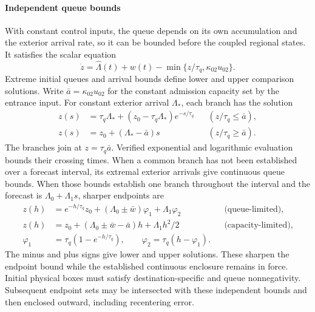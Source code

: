 \documentclass[preprint,12pt]{elsarticle}
\theoremstyle{definition}
\theoremstyle{plain}
\theoremstyle{definition}
\theoremstyle{plain}
\begin{document}
\paragraph{Independent queue bounds}
With constant control inputs, the queue depends on its own accumulation and
the exterior arrival rate, so it can be bounded before the coupled
regional states. It satisfies the scalar equation
\begin{equation}
 \dot z=\widehat\Lambda(t)+w(t)-\min\{z/\tau_q,\kappa_{02}u_{02}\}.
 \label{eq:structure-scalar-queue}
\end{equation}
Extreme initial queues and arrival bounds define lower and upper
comparison solutions. Write $\bar a=\kappa_{02}u_{02}$ for the constant
admission capacity set by the entrance input. For constant exterior arrival
$\Lambda_*$, each branch has the solution
\begin{equation}
 \begin{aligned}
 z(s)&=\tau_q\Lambda_*+(z_0-\tau_q\Lambda_*)e^{-s/\tau_q}
       &&(z/\tau_q\le\bar a),\\
 z(s)&=z_0+(\Lambda_*-\bar a)s&&(z/\tau_q\ge\bar a).
 \end{aligned}
 \label{eq:structure-queue-flows}
\end{equation}
The branches join at $z=\tau_q\bar a$. Verified exponential and logarithmic
evaluation bounds their crossing times. When a common branch has not
been established over a forecast interval, its extremal exterior arrivals
give continuous queue bounds. When those bounds establish one branch throughout the
interval and the forecast is $\Lambda_0+\Lambda_1s$, sharper endpoints are
\begin{equation}
\begin{aligned}
 z(h)&=e^{-h/\tau_q}z_0+(\Lambda_0\pm\bar w)\varphi_1+\Lambda_1\varphi_2
       &&\text{(queue-limited)},\\
 z(h)&=z_0+(\Lambda_0\pm\bar w-\bar a)h+\Lambda_1h^2/2
       &&\text{(capacity-limited)},\\
 \varphi_1&=\tau_q(1-e^{-h/\tau_q}),\qquad
 \varphi_2=\tau_q(h-\varphi_1).
\end{aligned}
\label{eq:structure-affine-queue}
\end{equation}
The minus and plus signs give lower and upper solutions. These sharpen
the endpoint bound while the established continuous enclosure remains
in force. Initial physical boxes must satisfy destination-specific and queue
nonnegativity. Subsequent endpoint sets may be intersected with these
independent bounds and then enclosed outward, including recentering error.
\end{document}
